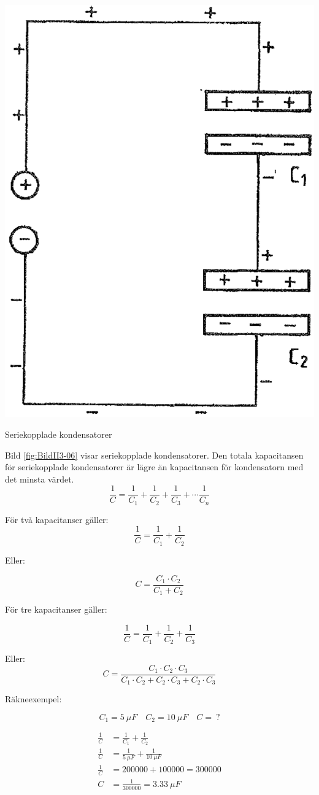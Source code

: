 \begin{marginfigure}%
  \includegraphics[width=.7\textwidth]{images/cropped_pdfs/bild_2_3-06.pdf}
  \caption{Seriekopplade kondensatorer}
  \label{fig:BildII3-06}
\end{marginfigure}

Bild \ref{fig:BildII3-06} visar seriekopplade kondensatorer.
Den totala kapacitansen för seriekopplade kondensatorer är lägre än kapacitansen
för kondensatorn med det minsta värdet.
\[
\frac{1}{C} = \frac{1}{C_1} + \frac{1}{C_2} + \frac{1}{C_3} + \cdots
\frac{1}{C_n}
\]

För två kapacitanser gäller:
\[ \frac{1}{C} = \frac{1}{C_1} + \frac{1}{C_2} \]

Eller:

\[  C = \frac{C_1 \cdot C_2}{C_1 + C_2} \]

För tre kapacitanser gäller:

\[  \frac{1}{C} = \frac{1}{C_1} + \frac{1}{C_2} + \frac{1}{C_3} \]

Eller:
\[ C = \frac{C_1 \cdot C_2 \cdot C_3}
   {C_1 \cdot C_2 + C_2 \cdot C_3 + C_2 \cdot C_3} \]

\noindent Räkneexempel:

\[ C_1 = 5\ \mu F \quad C_2 = 10\ \mu F \quad C =\ ? \]

\begin{align*}
  \frac{1}{C} &= \frac{1}{C_1} + \frac{1}{C_2} \\
  \frac{1}{C} &= \frac{1}{\SI{5}{\mu F}} + \frac{1}{\SI{10}{\mu F}}\\
  \frac{1}{C} &= \num{200000} + \num{100000} = \num{300000}\\
  C &= \frac{1}{\num{300000}} = \SI{3,33}{\mu F} \\
\end{align*}

